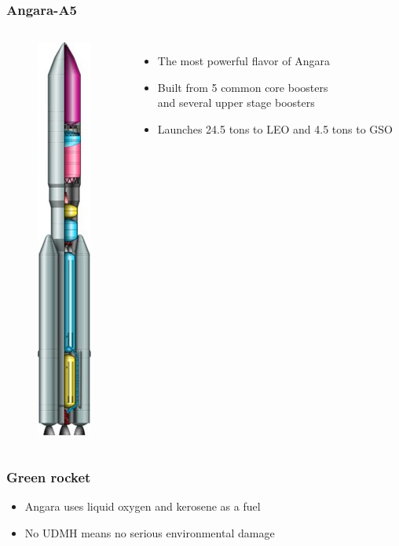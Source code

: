 \documentclass[onlymath]{beamer}
\newcommand\tw\textwidth
\begin{document}
\begin{frame}
  \frametitle{Angara-A5}
  \begin{columns}
    \column{.2\tw}
    \begin{figure}
      \centering
      \includegraphics[scale=0.4]{Angara-A5-scheme.jpg}
    \end{figure}
    \column{.8\tw}
    \begin{itemize}
    \item The most powerful flavor of Angara
    \item Built from 5 common core boosters \\and several upper stage
      boosters
    \item Launches 24.5 tons to LEO and 4.5 tons to GSO
    \end{itemize}
  \end{columns}

\end{frame}

\begin{frame}
  \frametitle{Green rocket}
  \begin{itemize}
  \item Angara uses liquid oxygen and kerosene as a fuel
  \item No UDMH means no serious environmental damage
  \end{itemize}
\end{frame}
\end{document}
